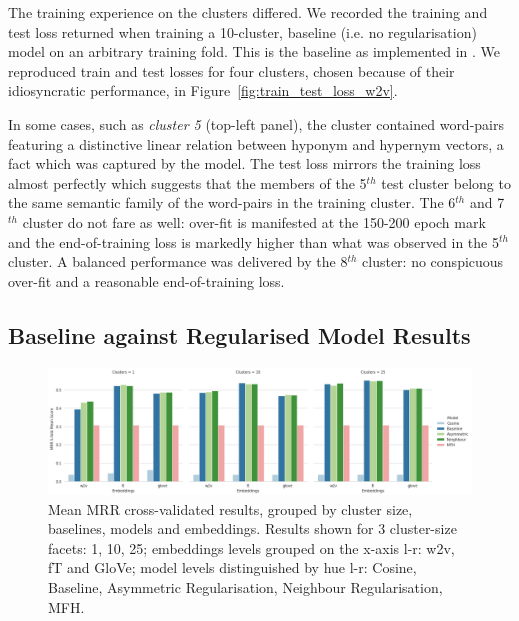 The training experience on the clusters differed.  We recorded the training and test loss returned when training a 10-cluster, baseline (i.e. no regularisation) model on an arbitrary training fold. This is the \citep{Fu2014} baseline as implemented in \citep{ustalov2017negative}.  We reproduced train and test losses for four clusters, chosen because of their idiosyncratic performance, in Figure~\ref{fig:train_test_loss_w2v}.

In some cases, such as \textit{cluster 5} (top-left panel), the cluster contained word-pairs featuring a distinctive linear relation between hyponym and hypernym vectors, a fact which was captured by the model.  The test loss mirrors the training loss almost perfectly which suggests that the members of the 5$^{th}$ test cluster belong to the same semantic family of the word-pairs in the training cluster.  The 6$^{th}$ and 7$^{th}$ cluster do not fare as well: over-fit is manifested at the 150-200 epoch mark and the end-of-training loss is markedly higher than what was observed in the 5$^{th}$ cluster.  A balanced performance was delivered by the 8$^{th}$ cluster: no conspicuous over-fit and a reasonable end-of-training loss.

\subsection{Baseline against Regularised Model Results}
\begin{figure}[ht!] 
  \centering
  \includegraphics[width=1.\linewidth]{images/MRR_5-fold_results_models_baselines_embeddings.png}
  \caption[Mean MRR cross-validated results, grouped by cluster size, baselines, models and embeddings]{Mean MRR cross-validated results, grouped by cluster size, baselines, models and embeddings.  Results shown for 3 cluster-size facets: 1, 10, 25; embeddings levels grouped on the x-axis l-r: w2v, fT and GloVe; model levels distinguished by hue l-r: Cosine, Baseline, Asymmetric Regularisation, Neighbour Regularisation, MFH.}
  \label{fig:MRR_models_baselines}
\end{figure}

